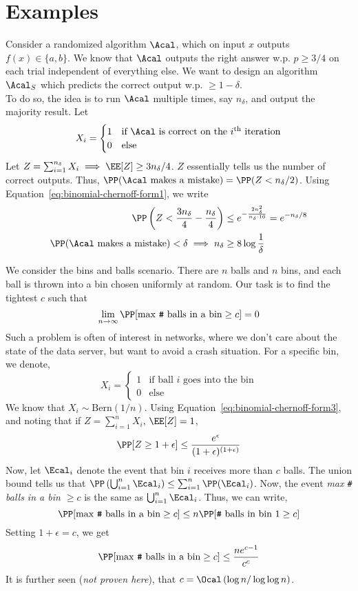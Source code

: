 \section{Examples}
\begin{eg}
Consider a randomized algorithm $\Acal$, which on input $x$ outputs $f(x) \in \{a,b\}$. We know that $\Acal$ outputs the right answer w.p. $p \geq 3/4$ on each trial independent of everything else. We want to design an algorithm $\Acal_S$ which predicts the correct output w.p. $\geq 1-\delta$. \\ 
To do so, the idea is to run $\Acal$ multiple times, say $n_\delta$, and output the majority result. Let
\[
X_i = \begin{cases}
    1 &\text{if $\Acal$ is correct on the $i^{\text{th}}$ iteration} \\
    0 &\text{else}
\end{cases}
\]
Let $Z = \sum_{i=1}^{n_\delta} X_i \implies \EE[Z] \geq 3n_\delta/4$. $Z$ essentially tells us the number of correct outputs. Thus, $\PP(\Acal \text{ makes a mistake}) = \PP(Z < n_\delta/2)$. Using Equation~\ref{eq:binomial-chernoff-form1}, we write
\begin{align*}
    \PP\left(Z < \frac{3n_\delta}{4} - \frac{n_\delta}{4}\right) &\leq e^{-\frac{2 n_\delta^2}{n_\delta \cdot 16}} = e^{-n_\delta/8} \\ 
    \PP(\Acal \text{ makes a mistake}) < \delta \implies n_\delta &\geq 8\log\frac{1}{\delta}
\end{align*}
\end{eg}
\begin{eg}
We consider the bins and balls scenario. There are $n$ balls and $n$ bins, and each ball is thrown into a bin chosen uniformly at random. Our task is to find the tightest $c$ such that
\[
\lim_{n\to\infty} \PP[\text{max \texttt{\#} balls in a bin} \geq c] = 0
\]
Such a problem is often of interest in networks, where we don't care about the state of the data server, but want to avoid a crash situation. For a specific bin, we denote,
\[
X_i = \begin{cases}
    1 &\text{if ball $i$ goes into the bin} \\
    0 &\text{else}
\end{cases}
\]
We know that $X_i \sim \text{Bern}(1/n)$. Using Equation~\ref{eq:binomial-chernoff-form3}, and noting that if $Z = \sum_{i=1}^n X_i$, $\EE[Z] = 1$,
\[
\PP[Z \geq 1 + \epsilon] \leq \frac{e^\epsilon}{(1+\epsilon)^{(1+\epsilon)}}
\]
Now, let $\Ecal_i$ denote the event that bin $i$ receives more than $c$ balls. The union bound tells us that $\PP\left(\bigcup_{i=1}^n \Ecal_i\right) \leq \sum_{i=1}^n \PP(\Ecal_i)$. Now, the event \textit{max \texttt{\#} balls in a bin $\geq c$} is the same as $\bigcup_{i=1}^n \Ecal_i$. Thus, we can write,
\[
\PP[\text{max \texttt{\#} balls in a bin} \geq c] \leq n \PP[\text{\texttt{\#} balls in bin $1 \geq c$}]
\]
Setting $1+\epsilon = c$, we get
\begin{align*}
    \PP[\text{max \texttt{\#} balls in a bin} \geq c] \leq \frac{ne^{c-1}}{c^c}
\end{align*}
It is further seen (\textit{not proven here}), that $c = \Ocal\left(\log n/ \log \log n\right)$.
\end{eg}